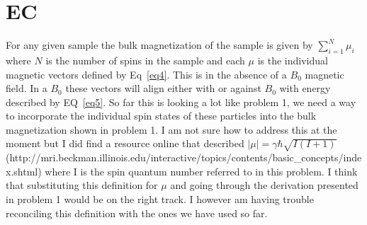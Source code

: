 \documentclass[12pt]{article}
\begin{document}
\section{EC}
For any given sample the bulk magnetization of the sample is given by $\sum_{i = 1}^{N}\mu _i$ where $N$ is the number of spins in the sample and each $\mu$ is the individual magnetic vectors defined by Eq~\ref{eq4}. This is in the absence of a $B_0$ magnetic field. In a $B_0$ these vectors will align either with or against $B_0$ with energy described by EQ~\ref{eq5}. So far this is looking a lot like problem 1, we need a way to incorporate the individual spin states of these particles into the bulk magnetization shown in problem 1. I am not sure how to address this at the moment but I did find a resource online that described $|\mu| = \gamma \hbar \sqrt{I(I+1)}$ (http://mri.beckman.illinois.edu/interactive/topics/contents/basic\_concepts/index.shtml) where I is the spin quantum number referred to in this problem. I think that substituting this definition for $\mu$ and going through the derivation presented in problem 1 would be on the right track. I however am having trouble reconciling this definition with the ones we have used so far. 
\end{document}
